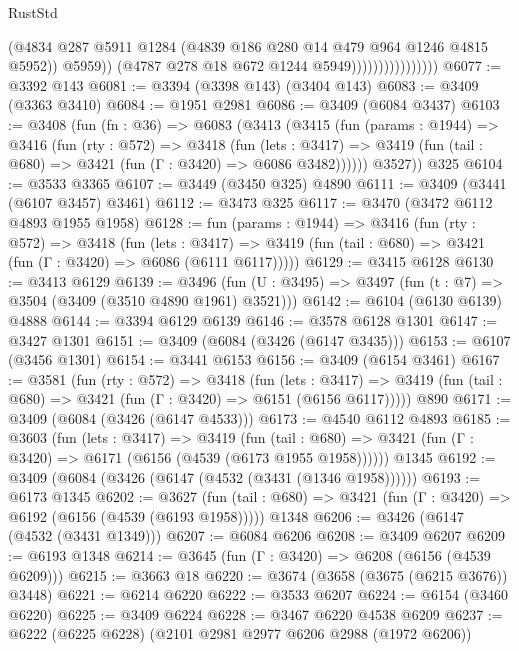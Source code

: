 \begin{lexlean}{RustStd}
\begin{coremodule}
                                      (@4834
                                        @287
                                        @5911
                                        @1284
                                        (@4839 @186 @280 @14 @479 @964 @1246 @4815 @5952))
                                      @5959))
                                  (@4787 @278 @18 @672 @1244 @5949))))))))))))))))
@6077 := @3392 @143
@6081 := @3394 (@3398 @143) (@3404 @143)
@6083 := @3409 (@3363 @3410)
@6084 := @1951 @2981
@6086 := @3409 (@6084 @3437)
@6103 := @3408
    (fun (fn : @36) =>
    @6083
      (@3413
        (@3415
          (fun (params : @1944) =>
          @3416
            (fun (rty : @572) =>
            @3418
              (fun (lets : @3417) =>
              @3419 (fun (tail : @680) => @3421 (fun (Γ : @3420) => @6086 @3482))))))
        @3527))
    @325
@6104 := @3533 @3365
@6107 := @3449 (@3450 @325) @4890
@6111 := @3409 (@3441 (@6107 @3457) @3461)
@6112 := @3473 @325
@6117 := @3470 (@3472 @6112 @4893 @1955 @1958)
@6128 := fun (params : @1944) =>
  @3416
    (fun (rty : @572) =>
    @3418
      (fun (lets : @3417) =>
      @3419 (fun (tail : @680) => @3421 (fun (Γ : @3420) => @6086 (@6111 @6117)))))
@6129 := @3415 @6128
@6130 := @3413 @6129
@6139 := @3496 (fun (U : @3495) => @3497 (fun (t : @7) => @3504 (@3409 (@3510 @4890 @1961) @3521)))
@6142 := @6104 (@6130 @6139) @4888
@6144 := @3394 @6129 @6139
@6146 := @3578 @6128 @1301
@6147 := @3427 @1301
@6151 := @3409 (@6084 (@3426 (@6147 @3435)))
@6153 := @6107 (@3456 @1301)
@6154 := @3441 @6153
@6156 := @3409 (@6154 @3461)
@6167 := @3581
    (fun (rty : @572) =>
    @3418
      (fun (lets : @3417) =>
      @3419 (fun (tail : @680) => @3421 (fun (Γ : @3420) => @6151 (@6156 @6117)))))
    @890
@6171 := @3409 (@6084 (@3426 (@6147 @4533)))
@6173 := @4540 @6112 @4893
@6185 := @3603
    (fun (lets : @3417) =>
    @3419
      (fun (tail : @680) => @3421 (fun (Γ : @3420) => @6171 (@6156 (@4539 (@6173 @1955 @1958))))))
    @1345
@6192 := @3409 (@6084 (@3426 (@6147 (@4532 (@3431 (@1346 @1958))))))
@6193 := @6173 @1345
@6202 := @3627
    (fun (tail : @680) => @3421 (fun (Γ : @3420) => @6192 (@6156 (@4539 (@6193 @1958)))))
    @1348
@6206 := @3426 (@6147 (@4532 (@3431 @1349)))
@6207 := @6084 @6206
@6208 := @3409 @6207
@6209 := @6193 @1348
@6214 := @3645 (fun (Γ : @3420) => @6208 (@6156 (@4539 @6209)))
@6215 := @3663 @18
@6220 := @3674 (@3658 (@3675 (@6215 @3676)) @3448)
@6221 := @6214 @6220
@6222 := @3533 @6207
@6224 := @6154 (@3460 @6220)
@6225 := @3409 @6224
@6228 := @3467 @6220 @4538 @6209
@6237 := @6222 (@6225 @6228) (@2101 @2981 @2977 @6206 @2988 (@1972 @6206))

\end{coremodule}
\end{lexlean}
